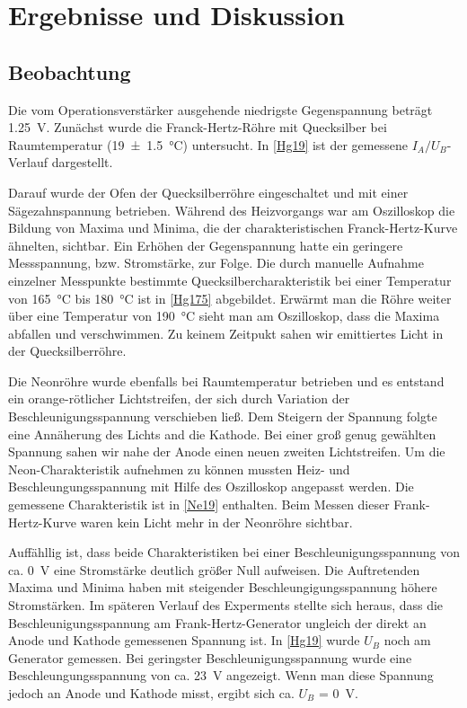 \documentclass[
	a4paper,
	12pt,
	pagesize,
	ngerman
]{scrartcl}
\begin{document}
	\section{Ergebnisse und Diskussion}
	

	\subsection{Beobachtung}
	Die vom Operationsverstärker ausgehende niedrigste Gegenspannung beträgt \SI{1,25}{V}. Zunächst wurde die Franck-Hertz-Röhre mit Quecksilber bei Raumtemperatur (\SI{19 +- 1,5}{\degreeCelsius}) untersucht. In \cref{Hg19} ist der gemessene $I_A/U_B$-Verlauf dargestellt.
	
	Darauf wurde der Ofen der Quecksilberröhre eingeschaltet und mit einer Sägezahnspannung betrieben. 
	Während des Heizvorgangs war am Oszilloskop die Bildung von Maxima und Minima, die der charakteristischen Franck-Hertz-Kurve ähnelten, sichtbar.
	Ein Erhöhen der Gegenspannung hatte ein geringere Messspannung, bzw. Stromstärke, zur Folge.
	Die durch manuelle Aufnahme einzelner Messpunkte bestimmte Quecksilbercharakteristik bei einer Temperatur von \SI{165}{\degreeCelsius} bis \SI{180}{\degreeCelsius} ist in \cref{Hg175} abgebildet.
	Erwärmt man die Röhre weiter über eine Temperatur von \SI{190}{\degreeCelsius} sieht man am Oszilloskop, dass die Maxima abfallen und verschwimmen.
	Zu keinem Zeitpukt sahen wir emittiertes Licht in der Quecksilberröhre.
	
	Die Neonröhre wurde ebenfalls bei Raumtemperatur betrieben und es entstand ein orange-rötlicher Lichtstreifen, der sich durch Variation der Beschleunigungsspannung verschieben ließ. 
	Dem Steigern der Spannung folgte eine Annäherung des Lichts and die Kathode.
	Bei einer groß genug gewählten Spannung sahen wir nahe der Anode einen neuen zweiten Lichtstreifen.
	Um die Neon-Charakteristik aufnehmen zu können mussten Heiz- und Beschleungungsspannung mit Hilfe des Oszilloskop angepasst werden.
	Die gemessene Charakteristik ist in \cref{Ne19} enthalten. Beim Messen dieser Frank-Hertz-Kurve waren kein Licht mehr in der Neonröhre sichtbar.
	
	Auffähllig ist, dass beide Charakteristiken bei einer Beschleunigungsspannung von ca. \SI{0}{V} eine Stromstärke deutlich größer Null aufweisen. 
	Die Auftretenden Maxima und Minima haben mit steigender Beschleungigungsspannung höhere Stromstärken.
	Im späteren Verlauf des Experments stellte sich heraus, dass die Beschleunigungsspannung am Frank-Hertz-Generator ungleich der direkt an Anode und Kathode gemessenen Spannung ist.
	In \cref{Hg19} wurde $U_B$ noch am Generator gemessen.
	Bei geringster Beschleunigungsspannung wurde eine Beschleungungsspannung von ca. \SI{23}{V} angezeigt.
	Wenn man diese Spannung jedoch an Anode und Kathode misst, ergibt sich ca. $U_B$ = \SI{0}{V}.
	
\end{document}
